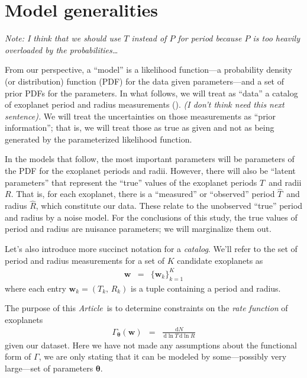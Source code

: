 \documentclass[12pt,preprint]{aastex}
\newcommand{\paper}{\emph{Article}}
\newcommand{\eqlabel}[1]{\label{eq:#1}}
\newcommand{\dd}{\ensuremath{\,\mathrm{d}}}
\newcommand{\bvec}[1]{\ensuremath{\boldsymbol{#1}}}
\newcommand{\rate}{\ensuremath{\Gamma}}
\newcommand{\ratepar}{{\ensuremath{\theta}}}
\newcommand{\ratepars}{{\ensuremath{\bvec{\ratepar}}}}
\newcommand{\obs}[1]{\ensuremath{\hat{#1}}}
\newcommand{\radius}{\ensuremath{R}}
\newcommand{\period}{\ensuremath{T}}
\newcommand{\entry}{{\ensuremath{\bvec{w}}}}
\newcommand{\catalog}{{\ensuremath{\bvec{\entry}}}}
\begin{document}
\section{Model generalities}

\emph{Note: I think that we should use $T$ instead of $P$ for period because
$P$ is too heavily overloaded by the probabilities\ldots}

From our perspective, a ``model'' is a likelihood function---a probability
density (or distribution) function (PDF) for the data given
parameters---and a set of prior PDFs for the parameters.
In what follows, we will treat as ``data'' a catalog of exoplanet period
and radius measurements (\citealt{petigura}).
\emph{(I don't think need this next sentence).}
We will treat the uncertainties on those measurements as ``prior
information''; that is, we will treat those as true as given and not as being
generated by the parameterized likelihood function.

In the models that follow, the most important parameters will be parameters
of the PDF for the exoplanet periods and radii.
However, there will also be ``latent parameters'' that represent the ``true''
values of the exoplanet periods \period\ and radii \radius.
That is, for each exoplanet, there is a ``measured'' or ``observed'' period
\obs{\period}\ and radius \obs{\radius}, which constitute our data.
These relate to the unobserved ``true'' period and radius by a noise model.
For the conclusions of this study, the true values of period and radius are
nuisance parameters; we will marginalize them out.

Let's also introduce more succinct notation for a \emph{catalog}.
We'll refer to the set of period and radius measurements for a set of $K$
candidate exoplanets as
\begin{eqnarray}
\catalog &=& \{\entry_k\}_{k=1}^K
\end{eqnarray}
where each entry $\entry_k = (\period_k,\,\radius_k)$ is a tuple containing a
period and radius.

The purpose of this \paper\ is to determine constraints on the \emph{rate
function} of exoplanets
\begin{eqnarray}\eqlabel{true-rate}
\rate_\ratepars (\entry)
&=& \frac{\dd N}{\dd\ln\period\dd\ln\radius}
\end{eqnarray}
given our dataset.
Here we have not made any assumptions about the functional form of \rate, we
are only stating that it can be modeled by some---possibly very large---set of
parameters \ratepars.
\end{document}
